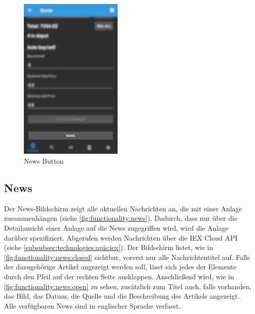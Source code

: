 \documentclass[a4paper]{article}
\begin{document}
\begin{figure}[H]
    \centering
    \includegraphics[height=8cm,keepaspectratio]{./images/news/news_button.png}
    \caption{News Button}
    \label{fig:functionality:news:button}
\end{figure}


\subsection{News}
\label{subsec:functionality:news}
Der News-Bildschirm zeigt alle aktuellen Nachrichten an, die mit einer Anlage zusammenhängen (siehe \autoref{fig:functionality:news}). Dadurch, dass nur über die Detailansicht einer Anlage auf die News zugegriffen wird, wird die Anlage darüber spezifiziert. Abgerufen werden Nachrichten über die IEX Cloud API (siehe \autoref{subsubsec:technologies:apis:iex}). Der Bildschirm listet, wie in \autoref{fig:functionality:news:closed} sichtbar, vorerst nur alle Nachrichtentitel auf. Falls der dazugehörige Artikel angezeigt werden soll, lässt sich jedes der Elemente durch den Pfeil auf der rechten Seite ausklappen. Anschließend wird, wie in \autoref{fig:functionality:news:open} zu sehen, zusätzlich zum Titel auch, falls vorhanden, das Bild, das Datum, die Quelle und die Beschreibung des Artikels angezeigt. Alle verfügbaren News sind in englischer Sprache verfasst.
\end{document}
